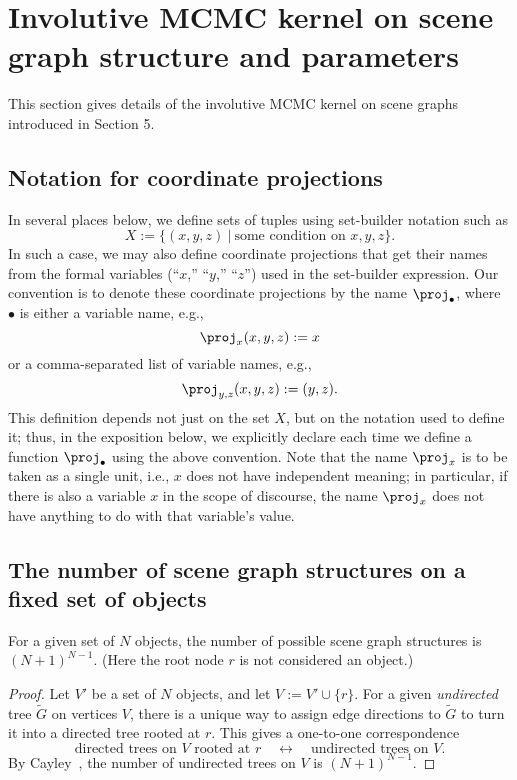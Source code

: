 \section{Involutive MCMC kernel on scene graph structure and parameters} \label{sec:involutive_move}

This section gives details of the involutive MCMC kernel on scene graphs introduced in Section 5.

\subsection{Notation for coordinate projections}\label{sec:proj-notation}
In several places below, we define sets of tuples using set-builder notation such as
\[ X := \{(x, y, z)\ |\ \text{some condition on $x, y, z$}\}. \]
In such a case, we may also define coordinate projections that get their names from the formal variables (``$x$,'' ``$y$,'' ``$z$'') used in the set-builder expression.
Our convention is to denote these coordinate projections by the name $\proj_\bullet$, where $\bullet$ is either a variable name, e.g.,
\[ \proj_x(x, y, z) := x \]
or a comma-separated list of variable names, e.g.,
\[ \proj_{y,z}(x, y, z) := (y, z). \]
This definition depends not just on the set $X$, but on the notation used to define it; thus, in the exposition below, we explicitly declare each time we define a function $\proj_\bullet$ using the above convention.
Note that the name $\proj_x$ is to be taken as a single unit, i.e., $x$ does not have independent meaning; in particular, if there is also a variable $x$ in the scope of discourse, the name $\proj_x$ does not have anything to do with that variable's value.

\subsection{The number of scene graph structures on a fixed set of objects}

\begin{proposition}
For a given set of $N$ objects, the number of possible scene graph structures is $(N+1)^{N-1}$.  (Here the root node $r$ is not considered an object.)
\end{proposition}
\begin{proof}
Let $V'$ be a set of $N$ objects, and let $V := V' \cup \{r\}$.  For a given {\em undirected} tree $\widetilde{G}$ on vertices $V$, there is a unique way to assign edge directions to $\widetilde{G}$ to turn it into a directed tree rooted at $r$.
This gives a one-to-one correspondence
\[
    \text{directed trees on $V$ rooted at $r$} \quad\longleftrightarrow\quad \text{undirected trees on $V$}.
\]
By Cayley~\citep{cayley_2009}, the number of undirected trees on $V$ is $(N+1)^{N-1}$.
\end{proof}

